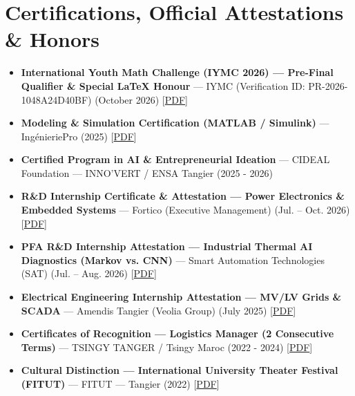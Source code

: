 \documentclass[10pt,a4paper]{article}
\begin{document}
\section*{Certifications, Official Attestations \& Honors}
\begin{itemize}
\item \textbf{International Youth Math Challenge (IYMC 2026) --- Pre-Final Qualifier \& Special LaTeX Honour} --- IYMC (Verification ID: PR-2026-1048A24D40BF) (October 2026) [\href{https://scidelo-andriasahy.github.io/assets/pdfs/Certificat_IYMC_2026.pdf}{PDF}]
\item \textbf{Modeling \& Simulation Certification (MATLAB / Simulink)} --- IngénieriePro (2025) [\href{https://scidelo-andriasahy.github.io/assets/pdfs/CertificatMatlab.pdf}{PDF}]
\item \textbf{Certified Program in AI \& Entrepreneurial Ideation} --- CIDEAL Foundation --- INNO'VERT / ENSA Tangier (2025 - 2026)
\item \textbf{R\&D Internship Certificate \& Attestation --- Power Electronics \& Embedded Systems} --- Fortico (Executive Management) (Jul. -- Oct. 2026) [\href{https://scidelo-andriasahy.github.io/assets/pdfs/Certificat_Stage_Fortico.pdf}{PDF}]
\item \textbf{PFA R\&D Internship Attestation --- Industrial Thermal AI Diagnostics (Markov vs. CNN)} --- Smart Automation Technologies (SAT) (Jul. -- Aug. 2026) [\href{https://scidelo-andriasahy.github.io/assets/pdfs/Attestation_Stage_PFA_SAT.pdf}{PDF}]
\item \textbf{Electrical Engineering Internship Attestation --- MV/LV Grids \& SCADA} --- Amendis Tangier (Veolia Group) (July 2025) [\href{https://scidelo-andriasahy.github.io/assets/pdfs/Attestation_Stage_Amendis.pdf}{PDF}]
\item \textbf{Certificates of Recognition --- Logistics Manager (2 Consecutive Terms)} --- TSINGY TANGER / Tsingy Maroc (2022 - 2024) [\href{https://scidelo-andriasahy.github.io/assets/pdfs/CertificatTsingyTanger1ereMandat.pdf}{PDF}]
\item \textbf{Cultural Distinction --- International University Theater Festival (FITUT)} --- FITUT --- Tangier (2022) [\href{https://scidelo-andriasahy.github.io/assets/pdfs/CertificatFITUT.pdf}{PDF}]
\end{itemize}
\end{document}
